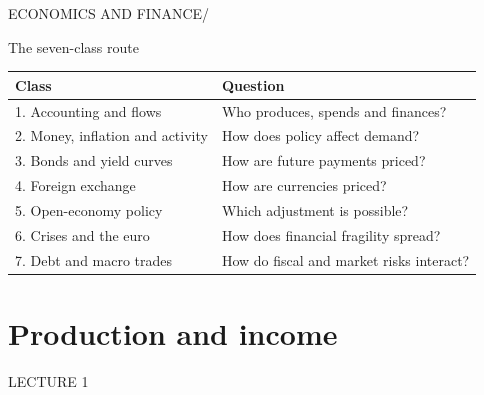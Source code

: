\documentclass[12pt,aspectratio=169]{beamer}
\begin{document}
\begin{frame}[plain]
{\color{Teal}\large ECONOMICS AND FINANCE\quad /}\par\vspace{9mm}{\Huge\bfseries Output, income and capital flows}\par\vspace{7mm}{\Large How do real resources become income, saving and financial claims?}
\end{frame}

\begin{frame}{The seven-class route}
\begin{center}\begin{tabular}{@{}p{}p{}@{}}\toprule \textbf{Class} & \textbf{Question}\\\midrule 1. Accounting and flows & Who produces, spends and finances?\\[2mm]
2. Money, inflation and activity & How does policy affect demand?\\[2mm]
3. Bonds and yield curves & How are future payments priced?\\[2mm]
4. Foreign exchange & How are currencies priced?\\[2mm]
5. Open-economy policy & Which adjustment is possible?\\[2mm]
6. Crises and the euro & How does financial fragility spread?\\[2mm]
7. Debt and macro trades & How do fiscal and market risks interact?\\\bottomrule\end{tabular}\end{center}
\end{frame}

\section[Production and income]{Production and income}
\begin{frame}[plain]
{\color{Gold}\large LECTURE 1}\par\vspace{9mm}{\Huge\bfseries Production and income}\par\vspace{7mm}{\Large Why can we measure the same economy in three ways?}
\end{frame}
\end{document}
